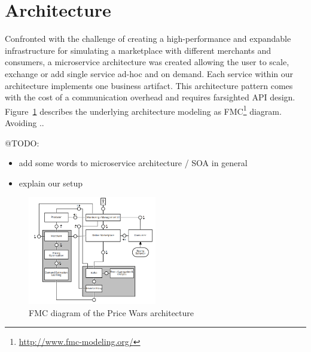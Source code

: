 \section{Architecture}
\label{sec:Architecture}
%
Confronted with the challenge of creating a high-performance and expandable infrastructure for simulating a marketplace with different merchants and consumers, a microservice architecture was created allowing the user to scale, exchange or add single service ad-hoc and on demand. Each service within our architecture implements one business artifact. This architecture pattern comes with the cost of a communication overhead and requires farsighted API design.\\

Figure~\ref{fig:fmc} describes the underlying architecture modeling as FMC\footnote{\url{http://www.fmc-modeling.org/}} diagram. Avoiding ..

@TODO:

\begin{itemize}
\item add some words to microservice architecture / SOA in general
\item explain our setup
\end{itemize}

%
\begin{figure}[h]
    \centering
    \includegraphics[width=0.5\textwidth]{images/architecture_fmc.png}
    \caption{FMC diagram of the Price Wars architecture}
    \label{fig:fmc}
\end{figure}
%